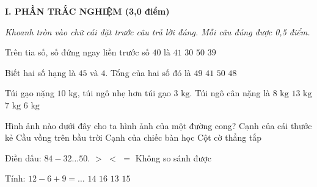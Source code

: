 
\setcounter{ex}{0}
\setcounter{bt}{0}

\textbf{\large I. PHẦN TRẮC NGHIỆM (3,0 điểm)}

{\itshape Khoanh tròn vào chữ cái đặt trước câu trả lời đúng. Mỗi câu đúng được 0,5 điểm.}

\begin{ex} %
Trên tia số, số đứng ngay liền trước số $40$ là
\choice
{$41$}
{$30$}
{$50$}
{\True $39$}
\end{ex}

\begin{ex} %
Biết hai số hạng là $45$ và $4$. Tổng của hai số đó là
\choice
{\True $49$}
{$41$}
{$50$}
{$48$}
\end{ex}

\begin{ex} %
Túi gạo nặng $10\text{ kg}$, túi ngô nhẹ hơn túi gạo $3\text{ kg}$. Túi ngô cân nặng là
\choice
{$8\text{ kg}$}
{$13\text{ kg}$}
{\True $7\text{ kg}$}
{$6\text{ kg}$}
\end{ex}

\begin{ex} %
Hình ảnh nào dưới đây cho ta hình ảnh của một đường cong?
\choice
{Cạnh của cái thước kẻ}
{\True Cầu vồng trên bầu trời}
{Cạnh của chiếc bàn học}
{Cột cờ thẳng tắp}
\end{ex}

\begin{ex} %
Điền dấu: $84 - 32 \dots 50$.
\choice
{\True $>$}
{$<$}
{$=$}
{Không so sánh được}
\end{ex}

\begin{ex} %
Tính: $12 - 6 + 9 = \dots$
\choice
{$14$}
{$16$}
{$13$}
{\True $15$}
\end{ex}

